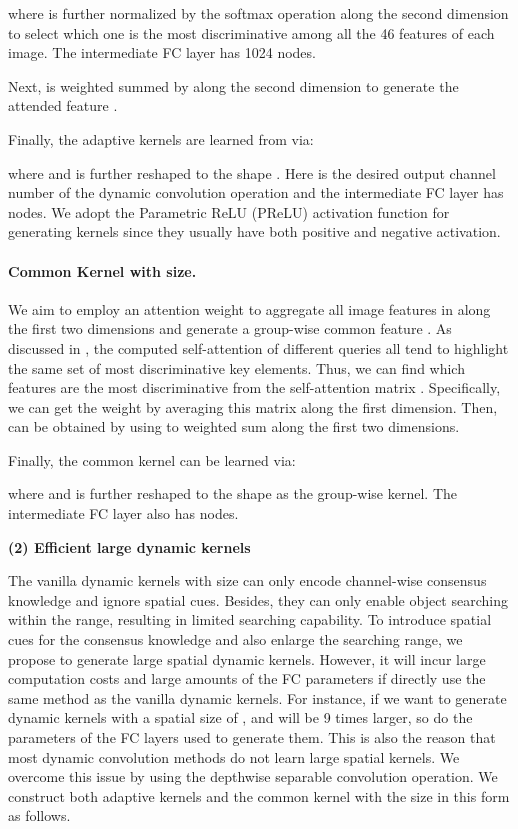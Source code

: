 \documentclass[10pt,twocolumn,letterpaper]{article}
\begin{document}
where  is further normalized by the softmax operation along the second dimension to select which one is the most discriminative among all the 46 features of each image. The intermediate FC layer has 1024 nodes.

Next,  is weighted summed by  along the second dimension to generate the attended feature .

Finally, the  adaptive kernels are learned from  via:

where  and is further reshaped to the shape . Here  is the desired output channel number of the dynamic convolution operation and the intermediate FC layer has  nodes. We adopt the Parametric ReLU (PReLU) \cite{he2015delving} activation function for generating kernels since they usually have both positive and negative activation.

\vspace{-3mm}
\paragraph{Common Kernel with  size.}
We aim to employ an attention weight  to aggregate all image features in  along the first two dimensions and generate a group-wise common feature .
As discussed in \cite{cao2019gcnet}, the computed self-attention of different queries all tend to highlight the same set of most discriminative key elements. Thus, we can find which features are the most discriminative from the self-attention matrix . Specifically, we can get the weight  by averaging this matrix along the first dimension. Then,  can be obtained by using  to weighted sum  along the first two dimensions.

Finally, the common kernel can be learned via:

where  and is further reshaped to the shape  as the group-wise kernel. The intermediate FC layer also has  nodes.

\vspace{3mm}
\noindent\textbf{(2) Efficient large dynamic kernels}
\vspace{2mm}

The vanilla dynamic kernels with  size can only encode channel-wise consensus knowledge and ignore spatial cues. Besides, they can only enable object searching within the  range, resulting in limited searching capability. To introduce spatial cues for the consensus knowledge and also enlarge the searching range, we propose to generate large spatial dynamic kernels. However, it will incur large computation costs and large amounts of the FC parameters if directly use the same method as the vanilla dynamic kernels. For instance, if we want to generate dynamic kernels with a spatial size of ,  and  will be 9 times larger, so do the parameters of the FC layers used to generate them.
This is also the reason that most dynamic convolution methods do not learn large spatial kernels. We overcome this issue by using the depthwise separable convolution \cite{howard2017mobilenets} operation. We construct both adaptive kernels and the common kernel with the  size in this form as follows.
\end{document}
